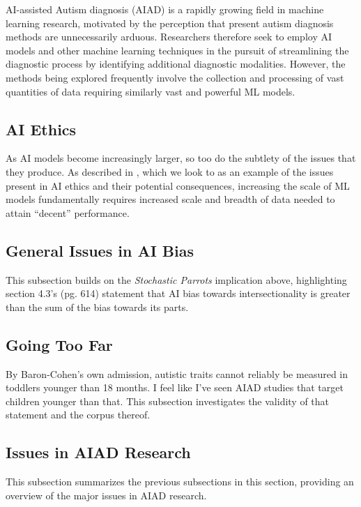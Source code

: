 \documentclass[letterpaper]{article}
\begin{document}
AI-assisted Autism diagnosis (AIAD) is a rapidly growing field in machine learning research, motivated by the perception that present autism diagnosis methods are unnecessarily arduous. Researchers therefore seek to employ AI models and other machine learning techniques in the pursuit of streamlining the diagnostic process by identifying additional diagnostic modalities. However, the methods being explored frequently involve the collection and processing of vast quantities of data requiring similarly vast and powerful ML models.

\subsection{AI Ethics}
As AI models become increasingly larger, so too do the subtlety of the issues that they produce. As described in \cite{stopar}, which we look to as an example of the issues present in AI ethics and their potential consequences, increasing the scale of ML models fundamentally requires increased scale and breadth of data needed to attain ``decent'' performance. 
\subsection{General Issues in AI Bias}
This subsection builds on the \textit{Stochastic Parrots} \cite{stopar} implication above, highlighting section 4.3's (pg. 614) statement that AI bias towards intersectionality is greater than the sum of the bias towards its parts.

\subsection{Going Too Far}
By Baron-Cohen's own admission, autistic traits cannot reliably be measured in toddlers younger than 18 months. I feel like I've seen AIAD studies that target children younger than that. This subsection investigates the validity of that statement and the corpus thereof.

\subsection{Issues in AIAD Research}
This subsection summarizes the previous subsections in this section, providing an overview of the major issues in AIAD research. 
\end{document}

